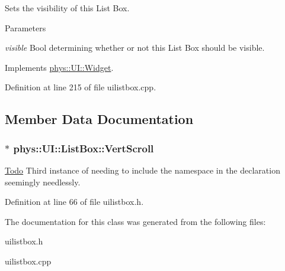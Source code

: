 Sets the visibility of this List Box. 


\begin{DoxyParams}{Parameters}
\item[{\em visible}]Bool determining whether or not this List Box should be visible. \end{DoxyParams}


Implements \hyperlink{classphys_1_1UI_1_1Widget_ab049233d8d5522a6ab42654b8924a3e0}{phys::UI::Widget}.



Definition at line 215 of file uilistbox.cpp.



\subsection{Member Data Documentation}
\hypertarget{classphys_1_1UI_1_1ListBox_ab2b012b345ff4bb1a5b228fef88d895c}{
\subsubsection[{VertScroll}]{$\ast$ {\bf phys::UI::ListBox::VertScroll}}}
\label{d0/d28/classphys_1_1UI_1_1ListBox_ab2b012b345ff4bb1a5b228fef88d895c}
\begin{Desc}
\item[\hyperlink{todo__todo000026}{Todo}]Third instance of needing to include the namespace in the declaration seemingly needlessly. \end{Desc}


Definition at line 66 of file uilistbox.h.



The documentation for this class was generated from the following files:\begin{DoxyCompactItemize}
\item 
uilistbox.h\item 
uilistbox.cpp\end{DoxyCompactItemize}
